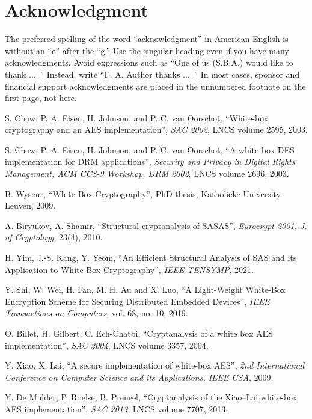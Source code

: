 \documentclass{ieeeaccess}
\begin{document}
\section*{Acknowledgment}

The preferred spelling of the word ``acknowledgment'' in American English is 
without an ``e'' after the ``g.'' Use the singular heading even if you have 
many acknowledgments. Avoid expressions such as ``One of us (S.B.A.) would 
like to thank $\ldots$ .'' Instead, write ``F. A. Author thanks $\ldots$ .'' In most 
cases, sponsor and financial support acknowledgments are placed in the 
unnumbered footnote on the first page, not here.



\begin{thebibliography}{00}

S. Chow, P. A. Eisen, H. Johnson, and P. C. van Oorschot, 
``White-box cryptography and an AES implementation'', 
\emph{SAC 2002}, LNCS volume 2595, 2003. 

S. Chow, P. A. Eisen, H. Johnson, and P. C. van Oorschot, 
``A white-box DES implementation for DRM applications'', 
\emph{Security and Privacy in Digital Rights Management, ACM CCS-9 Workshop, DRM 2002}, LNCS volume 2696, 2003.

B. Wyseur, 
``White-Box Cryptography'', 
PhD thesis, Katholieke University Leuven, 2009.

A. Biryukov, A. Shamir, 
``Structural cryptanalysis of SASAS'', 
\emph{Eurocrypt 2001, J. of Cryptology}, 23(4), 2010.

H. Yim, J.-S. Kang, Y. Yeom, 
``An Efficient Structural Analysis of SAS and its Application to White-Box Cryptography'', 
\emph{IEEE TENSYMP}, 2021.

Y. Shi, W. Wei, H. Fan, M. H. Au and X. Luo, 
``A Light-Weight White-Box Encryption Scheme for Securing Distributed Embedded Devices'', 
\emph{IEEE Transactions on Computers}, vol. 68, no. 10, 2019.

O. Billet, H. Gilbert, C. Ech-Chatbi, 
``Cryptanalysis of a white box AES implementation'', 
\emph{SAC 2004}, LNCS volume 3357, 2004.

Y. Xiao, X. Lai, 
``A secure implementation of white-box AES'', 
\emph{2nd International Conference on Computer Science and its Applications, IEEE CSA}, 2009.

Y. De Mulder, P. Roelse, B. Preneel, 
``Cryptanalysis of the Xiao–Lai white-box AES implementation'',
\emph{SAC 2013}, LNCS volume 7707, 2013.


\end{thebibliography}
\end{document}
